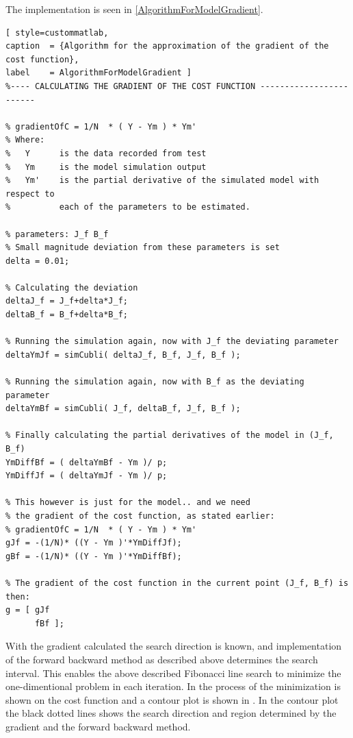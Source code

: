The implementation is seen in \autoref{AlgorithmForModelGradient}.
\begin{lstlisting}[ style=custommatlab,
caption  = {Algorithm for the approximation of the gradient of the cost function},
label    = AlgorithmForModelGradient ]
%---- CALCULATING THE GRADIENT OF THE COST FUNCTION ------------------------

% gradientOfC = 1/N  * ( Y - Ym ) * Ym' 
% Where:
%   Y      is the data recorded from test
%   Ym     is the model simulation output
%   Ym'    is the partial derivative of the simulated model with respect to
%          each of the parameters to be estimated.

% parameters: J_f B_f
% Small magnitude deviation from these parameters is set
delta = 0.01;

% Calculating the deviation
deltaJ_f = J_f+delta*J_f;
deltaB_f = B_f+delta*B_f;

% Running the simulation again, now with J_f the deviating parameter
deltaYmJf = simCubli( deltaJ_f, B_f, J_f, B_f );

% Running the simulation again, now with B_f as the deviating parameter
deltaYmBf = simCubli( J_f, deltaB_f, J_f, B_f );

% Finally calculating the partial derivatives of the model in (J_f, B_f)
YmDiffBf = ( deltaYmBf - Ym )/ p;
YmDiffJf = ( deltaYmJf - Ym )/ p;

% This however is just for the model.. and we need
% the gradient of the cost function, as stated earlier:
% gradientOfC = 1/N  * ( Y - Ym ) * Ym'
gJf = -(1/N)* ((Y - Ym )'*YmDiffJf);
gBf = -(1/N)* ((Y - Ym )'*YmDiffBf);

% The gradient of the cost function in the current point (J_f, B_f) is then:
g = [ gJf
      fBf ];
\end{lstlisting}

With the gradient calculated the search direction is known, and implementation of the forward backward method as described above determines the search interval. This enables the above described Fibonacci line search to minimize the one-dimentional problem in each iteration. In  the process of the minimization is shown on the cost function and a contour plot is shown in . In the contour plot the black dotted lines shows the search direction and region determined by the gradient and the forward backward method.


